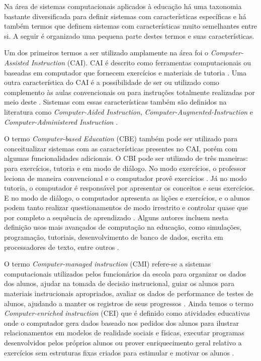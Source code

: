 
Na área de sistemas computacionais aplicados à educação há uma taxonomia bastante diversificada para definir sistemas com características específicas e há também termos que definem sistemas com características muito semelhantes entre si. A seguir é organizado uma pequena parte destes termos e suas características.

Um dos primeiros termos a ser utilizado amplamente na área foi o \emph{Computer-Assisted Instruction} (CAI). CAI é descrito como ferramentas computacionais ou baseadas em computador que fornecem exercícios e materiais de tutoria \cite{wheres98}. Uma outra característica do CAI é a possibilidade de ser ou utilizado como complemento às aulas convencionais ou para instruções totalmente realizadas por meio deste \cite{cotton91}. Sistemas com essas características também são definidos na literatura como \emph{Computer-Aided Instruction}, \emph{Computer-Augmented-Instruction} e \emph{Computer-Administered Instruction} \cite{effectiveness85}.

O termo \emph{Computer-based Education} (CBE) também pode ser utilizado para conceitualizar sistemas com as características presentes no CAI, porém com algumas funcionalidades adicionais. O CBI pode ser utilizado de três maneiras: para exercícios, tutoria e em modo de diálogo. No modo exercícios, o  professor leciona de maneira convencional e o computador provê exercícios \cite{wheres98}. Já no modo tutoria, o computador é responsável por apresentar os conceitos e seus exercícios. E no modo de diálogo, o computador apresenta as lições e exercícios, e o alunos podem tanto realizar questionamentos de modo irrestrito e controlar quase que por completo a sequência de aprendizado \cite{wheres98}. Alguns autores incluem nesta definição usos mais avançados de computação na educação, como simulações, programação, tutoriais, desenvolvimento de banco de dados, escrita em processadores de texto, entre outros \cite{cotton91}.


O termo \emph{Computer-managed instruction} (CMI) refere-se a sistemas computacionais utilizados pelos funcionários da escola para organizar os dados dos alunos, ajudar na tomada de decisão instrucional, guiar os alunos para materiais instrucionais apropriados, avaliar os dados de performance de testes de alunos, ajudando a manter os registros de seus progressos \cite{cotton91, wheres98}. Ainda temos o termo \emph{Computer-enriched instruction} (CEI) que é definido como atividades educativas onde o computador gera dados baseado nos pedidos dos alunos para ilustrar relacionamentos em modelos de realidade sociais e físicas, executar programas desenvolvidos pelos próprios alunos ou prover enriquecimento geral relativo a exercícios sem estruturas fixas criados para estimular e motivar os alunos \cite{cotton91}.

